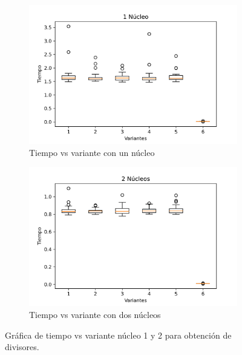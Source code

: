\documentclass{article}
\begin{document}
\begin{figure}[H]
\centering
\begin{subfigure}[b]{0.45\linewidth}
\includegraphics[width=\linewidth]{Gráfica_1.png}
\caption{Tiempo vs variante con un núcleo}
\end{subfigure}
\begin{subfigure}[b]{0.45\linewidth}
\includegraphics[width=\linewidth]{Gráfica_2.png}
\caption{Tiempo vs variante con dos núcleos}
\end{subfigure}
\caption{Gráfica de tiempo vs variante núcleo 1 y 2 para obtención de divisores.}
\label{fig:westminster}
\end{figure}
\end{document}
